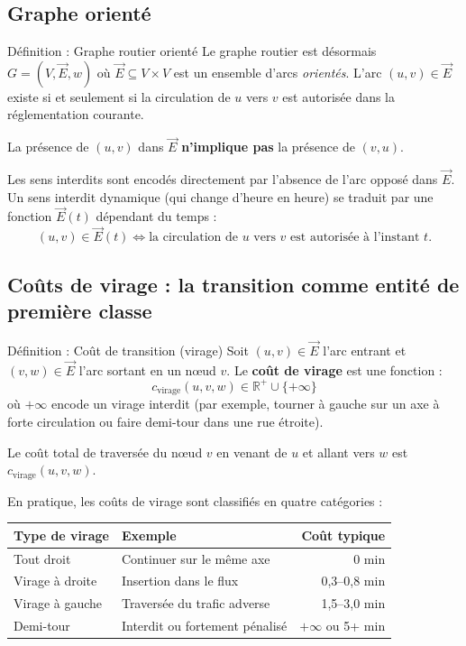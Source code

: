 \documentclass[12pt,a4paper]{article}
\theoremstyle{definition}
\theoremstyle{remark}
\begin{document}
\subsection{Graphe orienté}

\begin{defbox}{Définition : Graphe routier orienté}
Le graphe routier est désormais $G = (V, \vec{E}, w)$ où
$\vec{E} \subseteq V \times V$ est un ensemble d'arcs \emph{orientés}.
L'arc $(u, v) \in \vec{E}$ existe si et seulement si la circulation
de $u$ vers $v$ est autorisée dans la réglementation courante.

La présence de $(u, v)$ dans $\vec{E}$ \textbf{n'implique pas}
la présence de $(v, u)$.
\end{defbox}

Les sens interdits sont encodés directement par l'absence de l'arc
opposé dans $\vec{E}$. Un sens interdit dynamique (qui change d'heure
en heure) se traduit par une fonction $\vec{E}(t)$ dépendant du temps :
\[
  (u, v) \in \vec{E}(t) \iff \text{la circulation de } u \text{ vers } v
  \text{ est autorisée à l'instant } t.
\]

\subsection{Coûts de virage : la transition comme entité de première classe}

\begin{defbox}{Définition : Coût de transition (virage)}
Soit $(u, v) \in \vec{E}$ l'arc entrant et $(v, w) \in \vec{E}$ l'arc
sortant en un nœud $v$. Le \textbf{coût de virage} est une fonction :
\[
  c_\text{virage}(u, v, w) \in \mathbb{R}^+ \cup \{+\infty\}
\]
où $+\infty$ encode un virage interdit (par exemple, tourner à gauche
sur un axe à forte circulation ou faire demi-tour dans une rue étroite).

Le coût total de traversée du nœud $v$ en venant de $u$ et allant vers
$w$ est $c_\text{virage}(u, v, w)$.
\end{defbox}

En pratique, les coûts de virage sont classifiés en quatre catégories :

\begin{center}
\begin{tabular}{llr}
  \toprule
  \textbf{Type de virage} & \textbf{Exemple} & \textbf{Coût typique} \\
  \midrule
  Tout droit              & Continuer sur le même axe       & 0 min \\
  Virage à droite         & Insertion dans le flux          & 0,3–0,8 min \\
  Virage à gauche         & Traversée du trafic adverse     & 1,5–3,0 min \\
  Demi-tour               & Interdit ou fortement pénalisé  & $+\infty$ ou 5+ min \\
  \bottomrule
\end{tabular}
\end{center}
\end{document}
